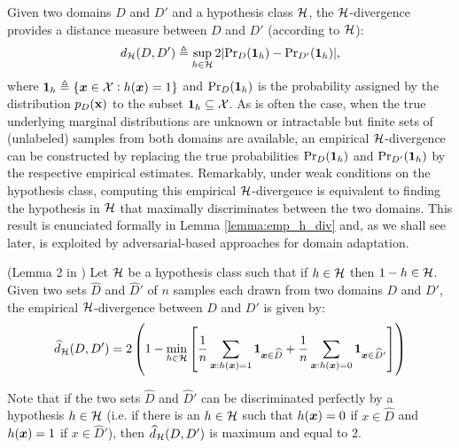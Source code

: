 Given two domains $D$ and $D'$ and a hypothesis class ${\mathcal{H}}$, the ${\mathcal{H}}$-divergence provides a distance measure between $D$ and $D'$ (according to ${\mathcal{H}}$):
\begin{equation*}
	d_{{\mathcal{H}}}(D,D') \triangleq \sup_{h \in {\mathcal{H}}} 2 |\mathrm{Pr}_{D}(\bm{1}_h) - \mathrm{Pr}_{D'}(\bm{1}_h)|,
\end{equation*}
where $\bm{1}_h \triangleq \{{\bm{x}} \in {\mathcal{X}}: h({\bm{x}})=1\}$ and $\mathrm{Pr}_{D}(\bm{1}_h)$ is the probability assigned by the distribution $p_D({\mathbf{x}})$ to the subset $\bm{1}_h \subseteq {\mathcal{X}}$. As is often the case, when the true underlying marginal distributions are unknown or intractable but finite sets of (unlabeled) samples from both domains are available, an empirical ${\mathcal{H}}$-divergence can be constructed by replacing the true probabilities $\mathrm{Pr}_{D}(\bm{1}_h)$ and $\mathrm{Pr}_{D'}(\bm{1}_h)$ by the respective empirical estimates. Remarkably, under weak conditions on the hypothesis class, computing this empirical ${\mathcal{H}}$-divergence is equivalent to finding the hypothesis in ${\mathcal{H}}$ that maximally discriminates between the two domains. This result is enunciated formally in Lemma \ref{lemma:emp_h_div} and, as we shall see later, is exploited by adversarial-based approaches for domain adaptation.
\begin{lemma}
	\label{lemma:emp_h_div}
	(Lemma 2 in \citet{BenDavid2010}) Let ${\mathcal{H}}$ be a hypothesis class such that if $h \in {\mathcal{H}}$ then $1-h \in {\mathcal{H}}$. Given two sets $\widehat{D}$ and $\widehat{D}'$ of $n$ samples each drawn from two domains $D$ and $D'$, the empirical ${\mathcal{H}}$-divergence between $D$ and $D'$ is given by:
	\begin{equation}
		\widehat{d}_{{\mathcal{H}}}(D,D') = 2 \left(1 - \min_{h \in {\mathcal{H}}} \left[\frac{1}{n} \sum_{{\bm{x}}: h({\bm{x}})=1} \bm{1}_{{\bm{x}} \in \widehat{D}} + \frac{1}{n} \sum_{{\bm{x}}: h({\bm{x}})=0} \bm{1}_{{\bm{x}} \in \widehat{D}'}\right]\right)
	\end{equation}
\end{lemma}
Note that if the two sets $\widehat{D}$ and $\widehat{D}'$ can be discriminated perfectly by a hypothesis $h \in {\mathcal{H}}$ (i.e. if there is an $h \in {\mathcal{H}}$ such that $h({\bm{x}}) = 0$ if $x \in \widehat{D}$ and $h({\bm{x}}) = 1$ if $x \in \widehat{D}'$), then $\widehat{d}_{{\mathcal{H}}}(D,D')$ is maximum and equal to 2.